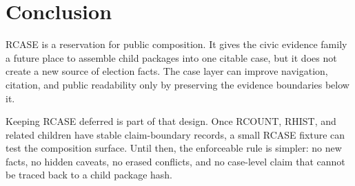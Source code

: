 \section{Conclusion}

RCASE is a reservation for public composition. It gives the civic evidence
family a future place to assemble child packages into one citable case, but it
does not create a new source of election facts. The case layer can improve
navigation, citation, and public readability only by preserving the evidence
boundaries below it.

Keeping RCASE deferred is part of that design. Once RCOUNT, RHIST, and related
children have stable claim-boundary records, a small RCASE fixture can test the
composition surface. Until then, the enforceable rule is simpler: no new facts,
no hidden caveats, no erased conflicts, and no case-level claim that cannot be
traced back to a child package hash.
